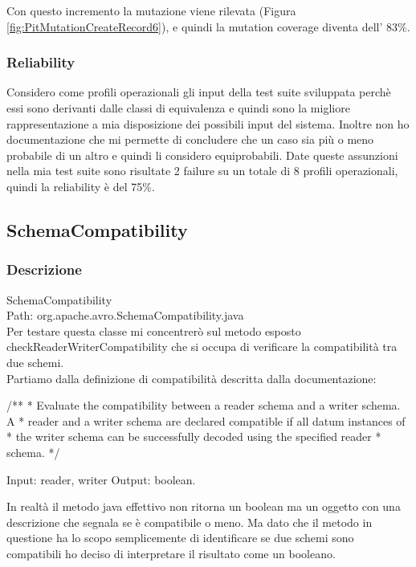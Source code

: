 \documentclass[12pt, a4paper]{article}
\begin{document}
Con questo incremento la mutazione viene rilevata (Figura \ref{fig:PitMutationCreateRecord6}), e quindi 
la mutation coverage diventa dell' 83\%. 

\subsubsection{Reliability}
Considero come profili operazionali gli input della test suite sviluppata perchè essi sono derivanti dalle classi di equivalenza
e quindi sono la migliore rappresentazione a mia disposizione dei possibili input del sistema. Inoltre non ho documentazione che
mi permette di concludere che un caso sia più o meno probabile di un altro e quindi li considero equiprobabili. Date queste 
assunzioni nella mia test suite sono risultate 2 failure su un totale di 8 profili operazionali, quindi la reliability è del 75\%.
\subsection{SchemaCompatibility}

\subsubsection{Descrizione}

SchemaCompatibility \\
Path: org.apache.avro.SchemaCompatibility.java \\

Per testare questa classe mi concentrerò sul metodo esposto checkReaderWriterCompatibility che
si occupa di verificare la compatibilità tra due schemi. \\
Partiamo dalla definizione di compatibilità descritta dalla documentazione:


/** * Evaluate the compatibility between a reader schema and a writer schema. A
* reader and a writer schema are declared compatible if all datum instances of *
the writer schema can be successfully decoded using the specified reader *
schema. */

Input: reader, writer
Output: boolean. 


In realtà il metodo java effettivo non ritorna un boolean ma un oggetto con una descrizione che segnala se è 
compatibile o meno. Ma dato che il metodo in questione ha lo scopo semplicemente di identificare se due schemi sono compatibili
ho deciso di interpretare il risultato come un booleano.
\end{document}
